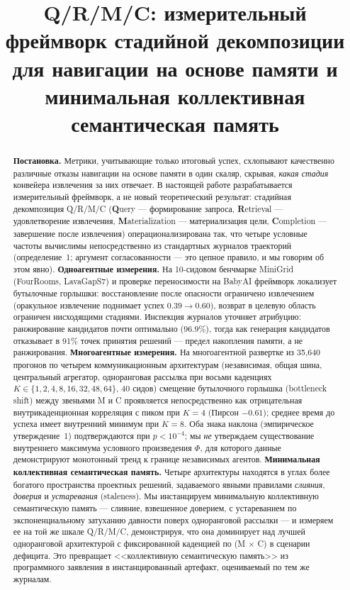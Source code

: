 \documentclass{article}
\title{Q/R/M/C: измерительный фреймворк стадийной декомпозиции для навигации на основе памяти и минимальная коллективная семантическая память}
\begin{document}
\maketitle

\begin{abstract}
\textbf{Постановка.} Метрики, учитывающие только итоговый успех, схлопывают качественно различные отказы навигации на основе памяти в один скаляр, скрывая, \emph{какая стадия} конвейера извлечения за них отвечает. В настоящей работе разрабатывается измерительный фреймворк, а не новый теоретический результат: стадийная декомпозиция Q/R/M/C (\textbf{Q}uery --- формирование запроса, \textbf{R}etrieval --- удовлетворение извлечения, \textbf{M}aterialization --- материализация цели, \textbf{C}ompletion --- завершение после извлечения) операционализирована так, что четыре условные частоты вычислимы непосредственно из стандартных журналов траекторий (определение~1; аргумент согласованности --- это цепное правило, и мы говорим об этом явно).
\textbf{Одноагентные измерения.} На 10-сидовом бенчмарке MiniGrid (FourRooms, LavaGapS7) и проверке переносимости на BabyAI фреймворк локализует бутылочные горлышки: восстановление после опасности ограничено извлечением (оракульное извлечение поднимает успех $0.39\to0.60$), возврат в целевую область ограничен нисходящими стадиями. Инспекция журналов уточняет атрибуцию: ранжирование кандидатов почти оптимально ($96.9\%$), тогда как генерация кандидатов отказывает в 91\% точек принятия решений --- предел накопления памяти, а не ранжирования.
\textbf{Многоагентные измерения.} На многоагентной развертке из 35{,}640 прогонов по четырем коммуникационным архитектурам (независимая, общая шина, центральный агрегатор, одноранговая рассылка при восьми каденциях $K{\in}\{1,2,4,8,16,32,48,64\}$, 40 сидов) смещение бутылочного горлышка (bottleneck shift) между звеньями M и C проявляется непосредственно как отрицательная внутрикаденционная корреляция с пиком при $K{=}4$ (Пирсон $-0.61$); среднее время до успеха имеет внутренний минимум при $K{=}8$. Оба знака наклона (эмпирическое утверждение~1) подтверждаются при $p<10^{-4}$; мы \emph{не} утверждаем существование внутреннего максимума условного произведения $\Phi$, для которого данные демонстрируют монотонный тренд к границе независимых агентов.
\textbf{Минимальная коллективная семантическая память.} Четыре архитектуры находятся в углах более богатого пространства проектных решений, задаваемого явными правилами \emph{слияния}, \emph{доверия} и \emph{устаревания} (staleness). Мы инстанцируем минимальную коллективную семантическую память --- слияние, взвешенное доверием, с устареванием по экспоненциальному затуханию давности поверх одноранговой рассылки --- и измеряем ее на той же шкале Q/R/M/C, демонстрируя, что она доминирует над лучшей одноранговой архитектурой с фиксированной каденцией по (M$\,\times\,$C) в сценарии дефицита. Это превращает <<коллективную семантическую память>> из программного заявления в инстанцированный артефакт, оцениваемый по тем же журналам.

\end{abstract}
\end{document}
